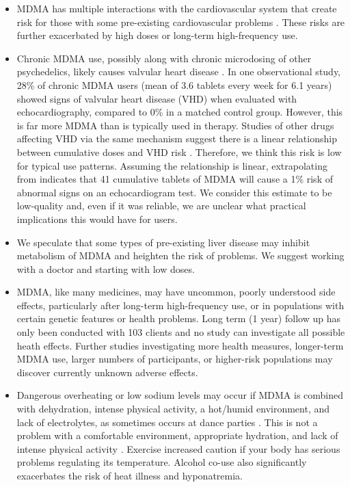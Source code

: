 \documentclass[12pt,letterpaper]{article}
\begin{document}
\begin{itemize}
    \item MDMA has multiple interactions with the cardiovascular system that create risk for those with some pre-existing cardiovascular problems \cite{bonsignoreCardio}. These risks are further exacerbated by high doses or long-term high-frequency use.
    \item Chronic MDMA use, possibly along with chronic microdosing of other psychedelics, likely causes valvular heart disease \cite{droogmans2007valvular,tagen2023valvular}. In one observational study, 28\% of chronic MDMA users (mean of 3.6 tablets every week for 6.1 years) showed signs of valvular heart disease (VHD) when evaluated with echocardiography, compared to 0\% in a matched control group. However, this is far more MDMA than is typically used in therapy. Studies of other drugs affecting VHD via the same mechanism suggest there is a linear relationship between cumulative doses and VHD risk \cite{corvol2007heart}. Therefore, we think this risk is low for typical use patterns. Assuming the relationship is linear, extrapolating from \textcite{droogmans2007valvular} indicates that 41 cumulative tablets of MDMA will cause a 1\% risk of abnormal signs on an echocardiogram test. We consider this estimate to be low-quality and, even if it was reliable, we are unclear what practical implications this would have for users.
    \item We speculate that some types of pre-existing liver disease may inhibit metabolism of MDMA and heighten the risk of problems. We suggest working with a doctor and starting with low doses.
    \item MDMA, like many medicines, may have uncommon, poorly understood side effects, particularly after long-term high-frequency use, or in populations with certain genetic features or health problems. Long term (1 year) follow up has only been conducted with 103 clients \cite{jeromeMDMALongTerm} and no study can investigate all possible heath effects. Further studies investigating more health measures, longer-term MDMA use, larger numbers of participants, or higher-risk populations may discover currently unknown adverse effects.
    \item Dangerous overheating or low sodium levels may occur if MDMA is combined with dehydration, intense physical activity, a hot/humid environment, and lack of electrolytes, as sometimes occurs at dance parties \cite{vanOverheatingAlcohol}. This is not a problem with a comfortable environment, appropriate hydration, and lack of intense physical activity \cite{mitchellMDMAClinicalTrial}. Exercise increased caution if your body has serious problems regulating its temperature. Alcohol co-use also significantly exacerbates the risk of heat illness and hyponatremia.

\end{itemize}
\end{document}
